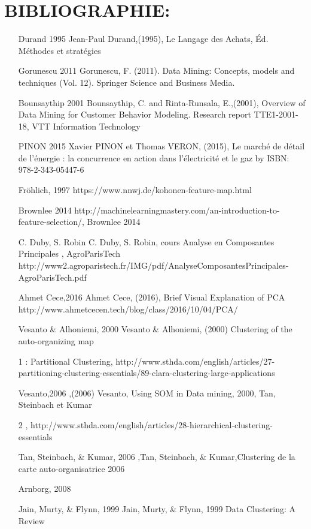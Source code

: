 \documentclass[12pt]{article}
\begin{document}
{\section{BIBLIOGRAPHIE:}
\begin{itemize}
    \item [Durand 1995] Jean-Paul Durand,(1995), Le Langage des Achats, Éd. Méthodes et stratégies
    \item [Gorunescu 2011] Gorunescu, F. (2011). Data Mining: Concepts, models and techniques (Vol. 12). Springer Science and Business Media.
    \item [Bounsaythip 2001] Bounsaythip, C. and Rinta-Runsala, E.,(2001), Overview of Data Mining for Customer Behavior Modeling. Research report TTE1-2001-18, VTT Information Technology 
    \item [PINON 2015] Xavier PINON et Thomas VERON, (2015), Le marché de détail de l’énergie : la concurrence en action dans l’électricité et le gaz by ISBN: 978-2-343-05447-6
    \item [Fröhlich, 1997] https://www.nnwj.de/kohonen-feature-map.html
    \item [Brownlee 2014] http://machinelearningmastery.com/an-introduction-to-feature-selection/, Brownlee 2014
    \item [C. Duby, S. Robin] C. Duby, S. Robin, cours Analyse en Composantes Principales , AgroParisTech http://www2.agroparistech.fr/IMG/pdf/AnalyseComposantesPrincipales-AgroParisTech.pdf
     \item [Ahmet Cece,2016] Ahmet Cece, (2016), Brief Visual Explanation of PCA http://www.ahmetcecen.tech/blog/class/2016/10/04/PCA/
     \item [Vesanto \& Alhoniemi, 2000] Vesanto \& Alhoniemi, (2000) Clustering of the auto-organizing map
    \item [1]: Partitional Clustering, http://www.sthda.com/english/articles/27-partitioning-clustering-essentials/89-clara-clustering-large-applications
    \item [Vesanto,2006],(2006) Vesanto, Using SOM in Data mining, 2000, Tan, Steinbach et Kumar
    \item [2], http://www.sthda.com/english/articles/28-hierarchical-clustering-essentials
    \item [Tan, Steinbach, \& Kumar, 2006],Tan, Steinbach, \& Kumar,Clustering de la carte auto-organisatrice 2006
    \item [Arnborg, 2008]
    \item [Jain, Murty, \& Flynn, 1999] Jain, Murty, \& Flynn, 1999 Data Clustering: A Review

\end{itemize}}
\end{document}
